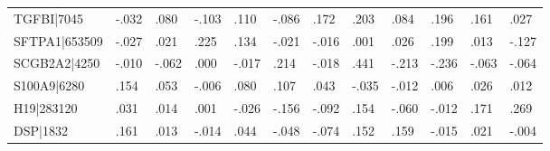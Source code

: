 \begin{table}[h]
\begin{tabular}{llllllllllll}
TGFBI|7045                      & -.032                            & .080                             & -.103                            & .110                             & -.086                            & .172                             & .203                             & .084                             & .196                             & .161                              & .027                              \\
SFTPA1|653509                   & -.027                            & .021                             & .225                             & .134                             & -.021                            & -.016                            & .001                             & .026                             & .199                             & .013                              & -.127                             \\
SCGB2A2|4250                    & -.010                            & -.062                            & .000                             & -.017                            & .214                             & -.018                            & .441                             & -.213                            & -.236                            & -.063                             & -.064                             \\
S100A9|6280                     & .154                             & .053                             & -.006                            & .080                             & .107                             & .043                             & -.035                            & -.012                            & .006                             & .026                              & .012                              \\
H19|283120                      & .031                             & .014                             & .001                             & -.026                            & -.156                            & -.092                            & .154                             & -.060                            & -.012                            & .171                              & .269                              \\
DSP|1832                        & .161                             & .013                             & -.014                            & .044                             & -.048                            & -.074                            & .152                             & .159                             & -.015                            & .021                              & -.004                             \\

\end{tabular}
\end{table}

